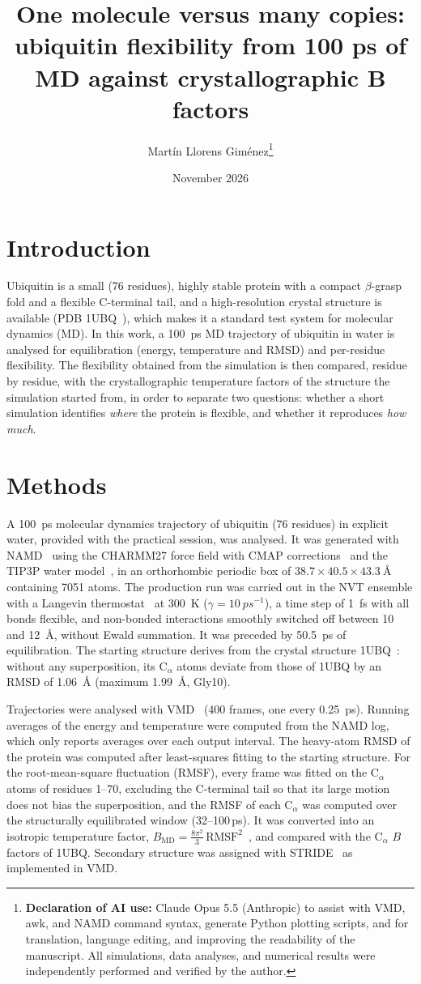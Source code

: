 \documentclass[10pt,a4paper]{article}
\title{One molecule versus many copies:\\ubiquitin flexibility from 100 ps of MD against crystallographic B factors}
\author{Martín Llorens Giménez\thanks{\textbf{Declaration of AI use:} Claude Opus 5.5 (Anthropic) to assist with VMD, awk, and NAMD command syntax, generate Python plotting scripts, and for translation, language editing, and improving the readability of the manuscript. All simulations, data analyses, and numerical results were independently performed and verified by the author.}}
\date{November 2026}
\begin{document}
\maketitle

\section{Introduction}
Ubiquitin is a small (76 residues), highly stable protein with a compact $\beta$-grasp fold and a flexible C-terminal tail, and a high-resolution crystal structure is available (PDB 1UBQ~\cite{1ubq}), which makes it a standard test system for molecular dynamics (MD). In this work, a \SI{100}{ps} MD trajectory of ubiquitin in water is analysed for equilibration (energy, temperature and RMSD) and per-residue flexibility. The flexibility obtained from the simulation is then compared, residue by residue, with the crystallographic temperature factors of the structure the simulation started from, in order to separate two questions: whether a short simulation identifies \emph{where} the protein is flexible, and whether it reproduces \emph{how much}.


\section{Methods}

A \SI{100}{ps} molecular dynamics trajectory of ubiquitin (76 residues) in explicit water, provided with the practical session, was analysed. It was generated with NAMD~\cite{namd} using the CHARMM27 force field with CMAP corrections~\cite{charmm22,cmap} and the TIP3P water model~\cite{tip3p}, in an orthorhombic periodic box of $38.7\times40.5\times\SI{43.3}{\angstrom}$ containing 7051 atoms. The production run was carried out in the NVT ensemble with a Langevin thermostat~\cite{bbk} at \SI{300}{K} ($\gamma = \SI{10}{ps^{-1}}$), a time step of \SI{1}{fs} with all bonds flexible, and non-bonded interactions smoothly switched off between 10 and \SI{12}{\angstrom}, without Ewald summation. It was preceded by \SI{50.5}{ps} of equilibration. The starting structure derives from the crystal structure 1UBQ~\cite{1ubq}: without any superposition, its C$_\alpha$ atoms deviate from those of 1UBQ by an RMSD of \SI{1.06}{\angstrom} (maximum \SI{1.99}{\angstrom}, Gly10).

Trajectories were analysed with VMD~\cite{vmd} (400 frames, one every \SI{0.25}{ps}). Running averages of the energy and temperature were computed from the NAMD log, which only reports averages over each output interval. The heavy-atom RMSD of the protein was computed after least-squares fitting to the starting structure. For the root-mean-square fluctuation (RMSF), every frame was fitted on the C$_\alpha$ atoms of residues 1--70, excluding the C-terminal tail so that its large motion does not bias the superposition, and the RMSF of each C$_\alpha$ was computed over the structurally equilibrated window (32--100\,ps). It was converted into an isotropic temperature factor, $B_\mathrm{MD} = \tfrac{8\pi^2}{3}\,\mathrm{RMSF}^2$~\cite{hunenberger}, and compared with the C$_\alpha$ $B$ factors of 1UBQ. Secondary structure was assigned with STRIDE~\cite{stride} as implemented in VMD.
\end{document}
